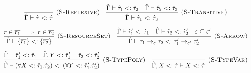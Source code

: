 \documentclass{llncs}
\begin{document}
\fbox{$\hat \Gamma \vdash \hat \tau <: \hat \tau$}

\[
\begin{array}{c}


\infer[\textsc{(S-Reflexive)}]
	{\hat \Gamma \vdash \hat \tau <: \hat \tau}
	{}
~~~
\infer[\textsc{(S-Transitive)}]
	{\hat \Gamma \vdash \hat \tau_1 <: \hat \tau_3}
	{\hat \Gamma \vdash \hat \tau_1 <: \hat \tau_2 & \hat \Gamma \vdash \hat \tau_2 <: \hat \tau_3} \\[2ex]

\infer[\textsc{(S-ResourceSet)}]
	{\hat \Gamma \vdash \{ \overline{r_1} \} <: \{ \overline{r_2} \}}
	{r \in \overline{r_1} \implies r \in \overline{r_2}}
~~~
\infer[\textsc{(S-Arrow)}]
	{\hat \Gamma \vdash \tau_1 \rightarrow_{\varepsilon} \tau_2 <: \tau_1' \rightarrow_{\varepsilon'} \tau_2'}
	{\hat \Gamma \vdash \hat \tau_1' <: \hat \tau_1 & \hat \Gamma \vdash \hat \tau_2 <: \hat \tau_2' & \varepsilon \subseteq \varepsilon'} \\[2ex]

\infer[\textsc{(S-TypePoly)}]
	{\hat \Gamma \vdash (\forall X <: \hat \tau_1 . \hat \tau_2) <: (\forall Y <: \hat \tau_1' . \hat \tau_2')}
	{\hat \Gamma \vdash \hat \tau_1' <: \hat \tau_1 & \hat \Gamma, Y <: \hat \tau_1' \vdash \hat \tau_2 <: \hat \tau_2'}
~~~
\infer[\textsc{(S-TypeVar)}]
	{\hat \Gamma, X <: \hat \tau \vdash X <: \hat \tau}
	{}                                                                                                                                                                                                                                                                                                                                                                                                                                                                                                                                                                                                                                                                                                                                                                                                                                                                                                                                                                                                                                                                                                                                                                                                                                                                                                                                                                                                                                                                                                                                                                                                                                                                                                                    

\end{array}
\]
\end{document}
